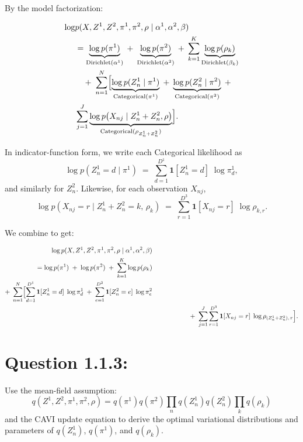\documentclass{article}
\begin{document}
\begin{multicols}{2}
    By the model factorization:

    \[
    \begin{aligned}
    \log &p(X,Z^1,Z^2,\pi^1,\pi^2,\rho \mid \alpha^1,\alpha^2,\beta)
    \\&=
    \underbrace{\log p(\pi^1)}_{\text{Dirichlet}(\alpha^1)}
    \;+\;
    \underbrace{\log p(\pi^2)}_{\text{Dirichlet}(\alpha^2)}
    \;+\;
    \sum_{k=1}^K \underbrace{\log p(\rho_k)}_{\text{Dirichlet}(\beta_k)}
    \\
    &\quad
    +\;\sum_{n=1}^N 
    \Bigl[
    \underbrace{\log p(Z_n^1 \mid \pi^1)}_{\text{Categorical}(\pi^1)}
    \;+\;
    \underbrace{\log p(Z_n^2 \mid \pi^2)}_{\text{Categorical}(\pi^2)}
    \;+\\\;
    &\sum_{j=1}^J \underbrace{\log p\bigl(X_{nj} \mid Z_n^1+Z_n^2,\rho\bigr)}_{\text{Categorical}(\rho_{Z_n^1+Z_n^2})}
    \Bigr].
    \end{aligned}
    \]

    In indicator-function form, we write each Categorical likelihood as
    \[
    \log p(Z_n^1 = d \mid \pi^1)
    \;=\;\sum_{d=1}^{D^1}\mathbf{1}[Z_n^1 = d]\;\log \pi^1_d,
    \]  
    and similarly for \(Z_n^2\).  
    Likewise, for each observation \(X_{nj}\),  
    \[
    \log p(X_{nj}=r \mid Z_n^1+Z_n^2 = k,\, \rho_k)
    \;=\; \sum_{r=1}^{D^3} \mathbf{1}[X_{nj}=r]\;\log \rho_{k,r}.
    \]

    We combine to get:

    \[
    \begin{aligned}
    \log p(X,Z^1,Z^2,\pi^1,\pi^2,\rho \mid \alpha^1,\alpha^2,\beta)
    &\\=
    \log p(\pi^1)
    \;+\;
    \log p(\pi^2)
    \;+\;
    \sum_{k=1}^K \log p(\rho_k)
    \\
    +\;
    \sum_{n=1}^N 
    \Bigl[
    \sum_{d=1}^{D^1} \mathbf{1}[Z_n^1 = d]\;\log \pi^1_d
    \;+\;
    \sum_{e=1}^{D^2} \mathbf{1}[Z_n^2 = e]\;\log \pi^2_e
    \\
    &\quad\qquad\qquad\;\;
    +\;\sum_{j=1}^J
        \sum_{r=1}^{D^3} 
        \mathbf{1}[X_{nj}=r]\;\log \rho_{(Z_n^1 + Z_n^2),\,r}
    \Bigr].
    \end{aligned}
    \]

    \section*{Question 1.1.3:}
   
    Use the mean-field assumption:  
    \[
    q(Z^1, Z^2, \pi^1, \pi^2, \rho) = q(\pi^1)q(\pi^2)\prod_n q(Z^1_n)q(Z^2_n)\prod_k q(\rho_k)
    \]  
    and the CAVI update equation to derive the optimal variational distributions and parameters of \(q(Z^1_n)\), \(q(\pi^1)\), and \(q(\rho_k)\). 


\end{multicols}
\end{document}

